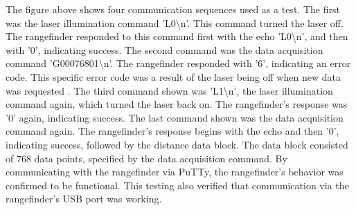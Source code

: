 The figure above shows four communication sequences used as a test. The first was the laser illumination command 'L0\textbackslash{}n'. This command turned the laser off. The rangefinder responded to this command first with the echo 'L0\textbackslash{}n', and then with '0', indicating success. The second command was the data acquisition command 'G00076801\textbackslash{}n'. The rangefinder responded with '6', indicating an error code. This specific error code was a result of the laser being off when new data was requested \cite{urg04lx_datasheet}. The third command shown was 'L1\textbackslash{}n', the laser illumination command again, which turned the laser back on. The rangefinder's response was '0' again, indicating success. The last command shown was the data acquisition command again. The rangefinder's response begins with the echo and then '0', indicating success, followed by the distance data block. The data block consisted of 768 data points, specified by the data acquisition command. By communicating with the rangefinder via PuTTy, the rangefinder's behavior was confirmed to be functional. This testing also verified that communication via the rangefinder's USB port was working.

